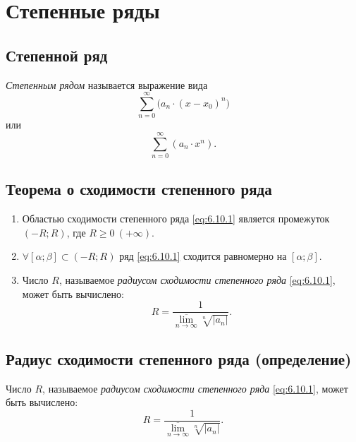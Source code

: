 \section{Степенные ряды}

\setcounter{subsection}{93}

\subsection{Степенной ряд}

\begin{definition}
    \emph{Степенным рядом} называется выражение вида
    \[
        \sum_{n=0}^{\infty}\big(a_n\cdot (x-x_0)^n\big)
    \]
    или
    \begin{equation}\label{eq:6.10.1}
        \sum_{n=0}^{\infty}(a_n \cdot x^n).
    \end{equation}
\end{definition}

\subsection{Теорема о сходимости степенного ряда}

\begin{theorem}\label{theorem:6.10.1}\leavevmode
    \begin{enumerate}
        \item Областью сходимости степенного ряда \ref{eq:6.10.1} является промежуток $(-R;R)$, где $R \geqslant 0 \ (+ \infty)$.
        \item $\forall [\alpha;\beta] \subset (-R;R)$ ряд \ref{eq:6.10.1} сходится равномерно на $[\alpha;\beta]$.
        \item Число $R$, называемое \emph{радиусом сходимости степенного ряда} \ref{eq:6.10.1}, может быть вычислено:
              \[
                  R = \frac{1}{\underset{n\rightarrow\infty}{\overline{\lim}}\sqrt[n]{|a_n|}}.
              \]
    \end{enumerate}
\end{theorem}

\subsection{Радиус сходимости степенного ряда (определение)}

\begin{definition}
    Число $R$, называемое \emph{радиусом сходимости степенного ряда} \ref{eq:6.10.1}, может быть вычислено:
    \[
        R = \frac{1}{\underset{n\rightarrow\infty}{\overline{\lim}}\sqrt[n]{|a_n|}}.
    \]
\end{definition}

